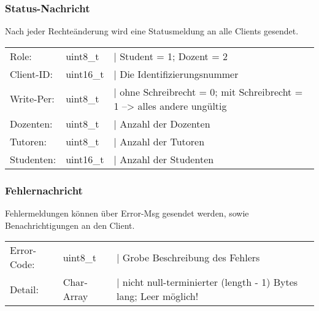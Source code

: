 
\subsubsection{Status-Nachricht}
Nach jeder Rechteänderung wird eine Statusmeldung an alle Clients gesendet.

\begin{tabular}{lll}
Role: & uint8\_t & | Student = 1; Dozent = 2 \\
Client-ID: & uint16\_t & | Die Identifizierungsnummer \\
Write-Per: & uint8\_t & | ohne Schreibrecht = 0; mit Schreibrecht = 1 --> alles andere ungültig \\
Dozenten: & uint8\_t & | Anzahl der Dozenten \\
Tutoren: & uint8\_t & | Anzahl der Tutoren \\
Studenten: & uint16\_t & | Anzahl der Studenten
\end{tabular}

\subsubsection{Fehlernachricht}
Fehlermeldungen können über Error-Msg gesendet werden, sowie Benachrichtigungen an den Client.

\begin{tabular}{lll}
Error-Code: & uint8\_t & | Grobe Beschreibung des Fehlers\\
Detail: & Char-Array & | nicht null-terminierter (length - 1) Bytes lang; Leer möglich!
\end{tabular}